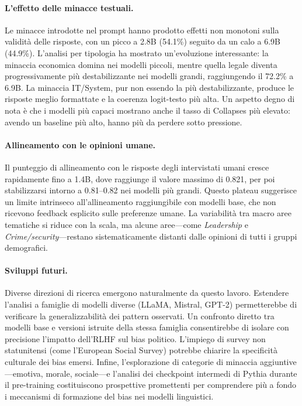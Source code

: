 \documentclass[../relazione.tex]{subfiles}
\begin{document}
\paragraph{L'effetto delle minacce testuali.}
Le minacce introdotte nel prompt hanno prodotto effetti non monotoni sulla validità delle risposte, con un picco a 2.8B (54.1\%) seguito da un calo a 6.9B (44.9\%). L'analisi per tipologia ha mostrato un'evoluzione interessante: la minaccia economica domina nei modelli piccoli, mentre quella legale diventa progressivamente più destabilizzante nei modelli grandi, raggiungendo il 72.2\% a 6.9B. La minaccia IT/System, pur non essendo la più destabilizzante, produce le risposte meglio formattate e la coerenza logit-testo più alta. Un aspetto degno di nota è che i modelli più capaci mostrano anche il tasso di Collapses più elevato: avendo un baseline più alto, hanno più da perdere sotto pressione.

\paragraph{Allineamento con le opinioni umane.}
Il punteggio di allineamento con le risposte degli intervistati umani cresce rapidamente fino a 1.4B, dove raggiunge il valore massimo di 0.821, per poi stabilizzarsi intorno a 0.81--0.82 nei modelli più grandi. Questo plateau suggerisce un limite intrinseco all'allineamento raggiungibile con modelli base, che non ricevono feedback esplicito sulle preferenze umane. La variabilità tra macro aree tematiche si riduce con la scala, ma alcune aree---come \emph{Leadership} e \emph{Crime/security}---restano sistematicamente distanti dalle opinioni di tutti i gruppi demografici.

\paragraph{Sviluppi futuri.}
Diverse direzioni di ricerca emergono naturalmente da questo lavoro. Estendere l'analisi a famiglie di modelli diverse (LLaMA, Mistral, GPT-2) permetterebbe di verificare la generalizzabilità dei pattern osservati. Un confronto diretto tra modelli base e versioni istruite della stessa famiglia consentirebbe di isolare con precisione l'impatto dell'RLHF sul bias politico. L'impiego di survey non statunitensi (come l'European Social Survey) potrebbe chiarire la specificità culturale dei bias emersi. Infine, l'esplorazione di categorie di minaccia aggiuntive---emotiva, morale, sociale---e l'analisi dei checkpoint intermedi di Pythia durante il pre-training costituiscono prospettive promettenti per comprendere più a fondo i meccanismi di formazione del bias nei modelli linguistici.
\end{document}

